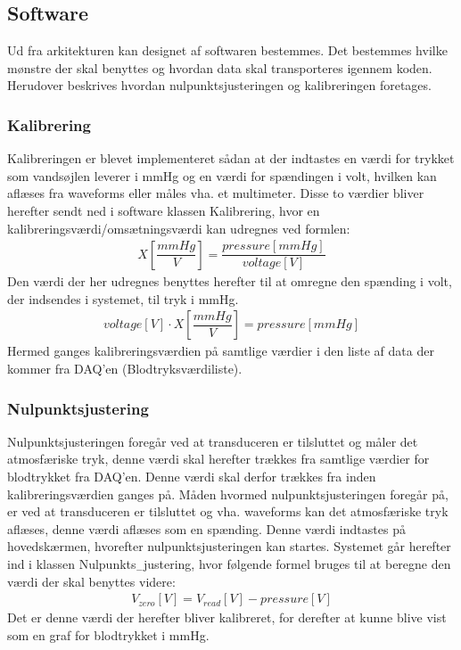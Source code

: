 \subsection{Software}
Ud fra arkitekturen kan designet af softwaren bestemmes. Det bestemmes hvilke mønstre der skal benyttes og hvordan data skal transporteres igennem koden. Herudover beskrives hvordan nulpunktsjusteringen og kalibreringen foretages.
\subsubsection{Kalibrering}
Kalibreringen er blevet implementeret sådan at der indtastes en værdi for trykket som vandsøjlen leverer i mmHg og en værdi for spændingen i volt, hvilken kan aflæses fra waveforms eller måles vha. et multimeter. Disse to værdier bliver herefter sendt ned i software klassen Kalibrering, hvor en kalibreringsværdi/omsætningsværdi kan udregnes ved formlen:
\begin{align}
X\left[\dfrac{mmHg}{V}\right]=\dfrac{pressure \left[mmHg\right]}{voltage \left[V\right]}
\end{align}
Den værdi der her udregnes benyttes herefter til at omregne den spænding i volt, der indsendes i systemet, til tryk i mmHg. 
\begin{align}
voltage \left[V\right]\cdot X\left[\dfrac{mmHg}{V}\right] = pressure \left[mmHg\right]
\end{align}
Hermed ganges kalibreringsværdien på samtlige værdier i den liste af data der kommer fra DAQ'en (Blodtryksværdiliste). 
\subsubsection{Nulpunktsjustering}
Nulpunktsjusteringen foregår ved at transduceren er tilsluttet og måler det atmosfæriske tryk, denne værdi skal herefter trækkes fra samtlige værdier for blodtrykket fra DAQ'en. Denne værdi skal derfor trækkes fra inden kalibreringsværdien ganges på. Måden hvormed nulpunktsjusteringen foregår på, er ved at transduceren er tilsluttet og vha. waveforms kan det atmosfæriske tryk aflæses, denne værdi aflæses som en spænding. Denne værdi indtastes på hovedskærmen, hvorefter nulpunktsjusteringen kan startes. Systemet går herefter ind i klassen Nulpunkts$_{-}$justering, hvor følgende formel bruges til at beregne den værdi der skal benyttes videre:
\begin{align}
V_{zero} \left[V\right]=V_{read}\left[V\right]-pressure \left[V\right] 
\end{align}
Det er denne værdi der herefter bliver kalibreret, for derefter at kunne blive vist som en graf for blodtrykket i mmHg.
